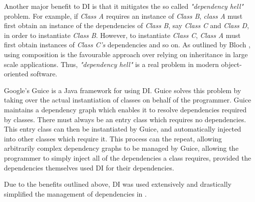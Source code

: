 Another major benefit to DI is that it mitigates the so called \textit{"dependency hell"} problem. For example, if \textit{Class A} requires an instance of \textit{Class B}, \textit{class A} must first obtain an instance of the dependencies of \textit{Class B}, say \textit{Class C} and \textit{Class D}, in order to instantiate \textit{Class B}. However, to instantiate \textit{Class C}, \textit{Class A} must first obtain instances of \textit{Class C's} dependencies and so on. As outlined by Bloch \cite{effecitve-java}, using composition is the favourable approach over relying on inheritance in large scale applications. Thus, \textit{"dependency hell"} is a real problem in modern object-oriented software.

Google's Guice \cite{guice} is a Java framework for using DI. Guice solves this problem by taking over the actual instantiation of classes on behalf of the programmer. Guice maintains a dependency graph which enables it to resolve dependencies required by classes. There must always be an entry class which requires no dependencies. This entry class can then be instantiated by Guice, and automatically injected into other classes which require it. This process can the repeat, allowing arbitrarily complex dependency graphs to be managed by Guice, allowing the programmer to simply inject all of the dependencies a class requires, provided the dependencies themselves used DI for their dependencies.

Due to the benefits outlined above, DI was used extensively and drastically simplified the management of dependencies in \game{}.